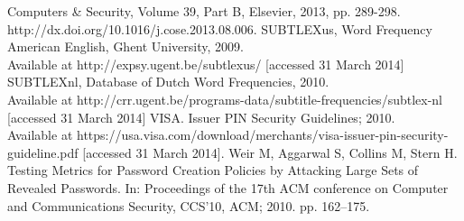 \documentclass[a4paper, 11pt]{article}
\begin{document}
\begin{thebibliography}{99}
  Computers \& Security, Volume 39, Part B, Elsevier, 2013, pp. 289-298. \\
  http://dx.doi.org/10.1016/j.cose.2013.08.006.
 SUBTLEXus, Word Frequency American English, Ghent University, 2009. \\
  Available at http://expsy.ugent.be/subtlexus/ [accessed 31 March 2014]
 SUBTLEXnl, Database of Dutch Word Frequencies, 2010. \\
  Available at http://crr.ugent.be/programs-data/subtitle-frequencies/subtlex-nl [accessed 31 March 2014]
 VISA. Issuer PIN Security Guidelines; 2010.\\
  Available at https://usa.visa.com/download/merchants/visa-issuer-pin-security-guideline.pdf 
  [accessed 31 March 2014].
  Weir M, Aggarwal S, Collins M, Stern H.
  Testing Metrics for Password Creation Policies by Attacking Large Sets of Revealed Passwords.
  In: Proceedings of the 17th ACM conference on Computer and Communications Security, CCS'10,
  ACM; 2010. pp. 162--175.
\end{thebibliography}
\end{document}
